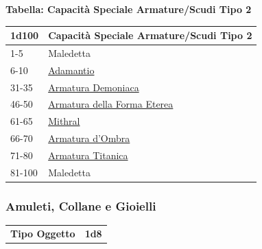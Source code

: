 \begin{multicols}{2}
{%

\textbf{Tabella: Capacità Speciale Armature/Scudi Tipo 2}\hypertarget{Capacità Speciale Armature / Scudi Tipo 2}{}

\medskip

{\small\begin{tabularx}{\linewidth}{ll}
		\toprule
\textbf{1d100} & \textbf{Capacità Speciale Armature/Scudi Tipo 2}\\
\toprule
1-5 & Maledetta\\
6-10 &\hyperlink{Adamantio}{Adamantio}\\
31-35& \hyperlink{Armatura Demoniaca}{Armatura Demoniaca}\\
46-50& \hyperlink{Armatura della Forma Eterea}{Armatura della Forma Eterea}\\
61-65 &\hyperlink{Mithral}{Mithral}\\
66-70 &\hyperlink{Armatura d'Ombra}{Armatura d'Ombra}\\
71-80 &\hyperlink{Armatura Titanica}{Armatura Titanica}\\
81-100 & Maledetta\\
\end{tabularx}}

\subsubsection{Amuleti, Collane e Gioielli}\hypertarget{amuleticollanegioielli}{}\label{amuleticollanegioielli}

{\small\begin{tabular}{ll}
\textbf{Tipo Oggetto}&\textbf{1d8}\\
\end{tabular}}

\medskip\hypertarget{amuleticollanegioielli1}{}

}
\end{multicols}
